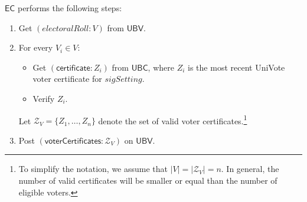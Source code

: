 \documentclass[bibtotoc,halfparskip,oneside]{scrreprt}
\newcommand{\EC}{\ensuremath{\mathsf{EC}}\xspace}
\newcommand{\UBC}{\ensuremath{\mathsf{UBC}}\xspace}
\newcommand{\UBV}{\ensuremath{\mathsf{UBV}}\xspace}
\begin{document}
	\EC performs the following steps:
	\begin{enumerate}[resume]
		\item Get  $(\mathit{electoralRoll}:V)$ from \UBV.
		\item For every $V_i\in V$:
		\begin{itemize}
			\item Get $(\mathsf{certificate}:Z_i)$ from \UBC, where $Z_i$ is the most recent UniVote voter certificate for $\mathit{sigSetting}$.
			\item Verify $Z_i$.
		\end{itemize}
		Let $\mathcal{Z}_V=\{Z_1,\ldots,Z_{n}\}$ denote the set of valid voter certificates.\footnote{To simplify the notation, we assume that $|V|=|\mathcal{Z}_V|=n$. In general, the number of valid certificates will be smaller or equal than the number of eligible voters.}
		\item Post $(\mathsf{voterCertificates}:\mathcal{Z}_V)$ on \UBV.
	\end{enumerate}
	
	
\end{document}
